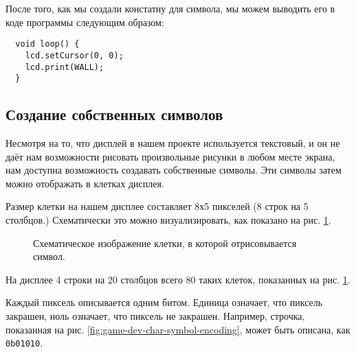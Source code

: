 \documentclass[../sparc.tex]{subfiles}
\begin{document}
После того, как мы создали констатну для символа, мы можем выводить его в коде
программы следующим образом:

\begin{verbatim}
  void loop() {
    lcd.setCursor(0, 0);
    lcd.print(WALL);
  }
\end{verbatim}

\subsection{Создание собственных символов}

Несмотря на то, что дисплей в нашем проекте используется текстовый, и он не даёт
нам возможности рисовать произвольные рисунки в любом месте экрана, нам доступна
возможность создавать собственные символы.  Эти символы затем можно отображать в
клетках дисплея.

Размер клетки на нашем дисплее составляет 8х5 пикселей (8 строк на 5 столбцов.)
Схематически это можно визуализировать, как показано на
рис. \ref{fig:game-dev-char}.

\begin{figure}[ht]
  \centering
  \caption{Схематическое изображение клетки, в которой отрисовывается символ.}
  \label{fig:game-dev-char}
\end{figure}

На дисплее 4 строки на 20 столбцов всего 80 таких клеток, показанных на рис.
\ref{fig:game-dev-char}.

Каждый пиксель описывается одним битом. Единица означает, что пиксель закрашен,
ноль означает, что пиксель не закрашен. Например, строчка, показанная на рис.
\ref{fig:game-dev-char-symbol-encoding}, может быть описана, как
\texttt{0b01010}.

\end{document}

